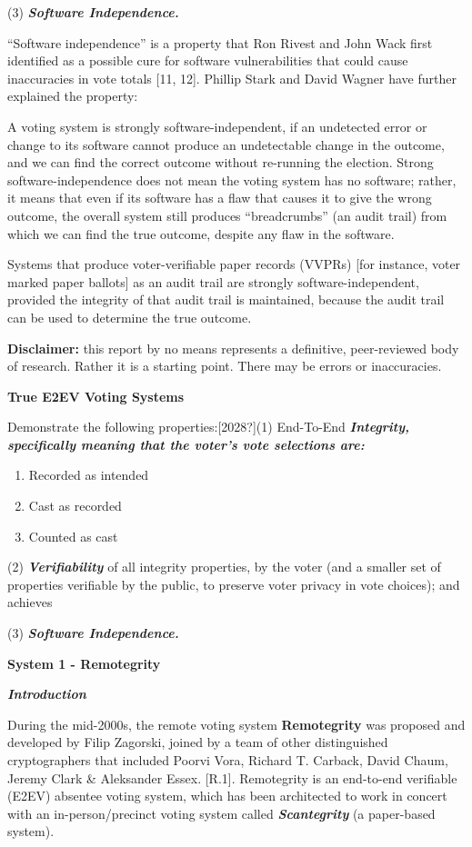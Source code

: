 (3) \textbf{\textit{Software Independence.}}

``Software independence'' is a property that Ron Rivest and John Wack first identified as a possible cure for software vulnerabilities that could cause inaccuracies in vote totals [11, 12]. Phillip Stark and David Wagner have further explained the property:

A voting system is strongly software-independent, if an undetected error or change to its software cannot produce an undetectable change in the outcome, and we can find the correct outcome without re-running the election. Strong software-independence does not mean the voting system has no software; rather, it means that even if its software has a flaw that causes it to give the wrong outcome, the overall system still produces ``breadcrumbs'' (an audit trail) from which we can find the true outcome, despite any flaw in the software.

Systems that produce voter-verifiable paper records (VVPRs) [for instance, voter marked paper ballots] as an audit trail are strongly software-independent, provided the integrity of that audit trail is maintained, because the audit trail can be used to determine the true outcome.

\textbf{Disclaimer: }this report by no means represents a definitive, peer-reviewed body of research. Rather it is a starting point. There may be errors or inaccuracies.

\textbf{True E2EV Voting Systems}

Demonstrate the following properties:[2028?](1) End-To-End \textbf{\textit{Integrity, specifically meaning that the voter's vote selections are: }}

\begin{enumerate}
\item Recorded as intended
\item Cast as recorded
\item Counted as cast
\end{enumerate}
(2) \textbf{\textit{Verifiability }}of all integrity properties, by the voter (and a smaller set of properties verifiable by the public, to preserve voter privacy in vote choices); and achieves

(3) \textbf{\textit{Software Independence.}}

\textbf{System 1 - Remotegrity}

\textbf{\textit{Introduction}}

During the mid-2000s, the remote voting system \textbf{Remotegrity }was proposed and developed by Filip Zagorski, joined by a team of other distinguished cryptographers that included Poorvi Vora, Richard T. Carback, David Chaum, Jeremy Clark \& Aleksander Essex. [R.1]. Remotegrity is an end-to-end verifiable (E2EV) absentee voting system, which has been architected to work in concert with an in-person/precinct voting system called \textbf{\textit{Scantegrity }}(a paper-based system).


